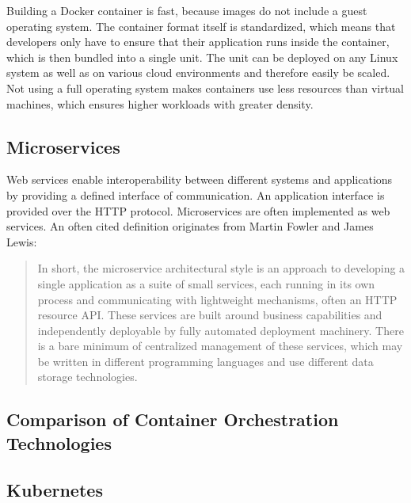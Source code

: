 Building a Docker container is fast, because images do not include a
guest operating system. The container format itself is standardized,
which means that developers only have to ensure that their application
runs inside the container, which is then bundled into a single unit. The
unit can be deployed on any Linux system as well as on various cloud
environments and therefore easily be scaled. Not using a full operating
system makes containers use less resources than virtual machines, which
ensures higher workloads with greater density. \cite{joy2015}

\subsection{Microservices}\label{microservices}

Web services enable interoperability between different systems and
applications by providing a defined interface of
communication\cite{baier-kub}. An application interface is provided over
the HTTP protocol. Microservices are often implemented as web services.
An often cited definition originates from Martin Fowler and James Lewis:

\begin{quote}
In short, the microservice architectural style is an approach to
developing a single application as a suite of small services, each
running in its own process and communicating with lightweight
mechanisms, often an HTTP resource API. These services are built around
business capabilities and independently deployable by fully automated
deployment machinery. There is a bare minimum of centralized management
of these services, which may be written in different programming
languages and use different data storage technologies.
\cite{lewis2014microservices}
\end{quote}


\subsection{Comparison of Container Orchestration
Technologies}\label{comparison-of-container-orchestration-technologies}

\subsection{Kubernetes}\label{kubernetes}

